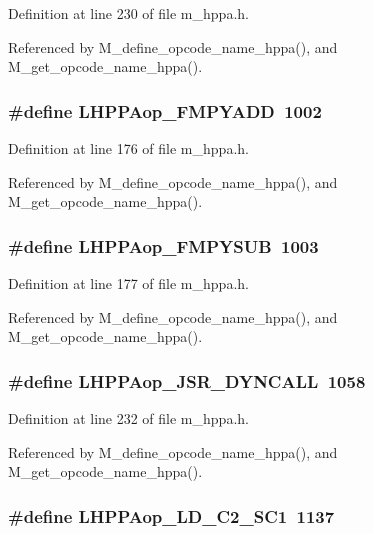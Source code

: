 Definition at line 230 of file m\_\-hppa.h.

Referenced by M\_\-define\_\-opcode\_\-name\_\-hppa(), and M\_\-get\_\-opcode\_\-name\_\-hppa().
\subsubsection{\setlength{\rightskip}{0pt plus 5cm}\#define LHPPAop\_\-FMPYADD~1002}\label{m__hppa_8h_5016d425f62ad5c6b7603207500e77b1}




Definition at line 176 of file m\_\-hppa.h.

Referenced by M\_\-define\_\-opcode\_\-name\_\-hppa(), and M\_\-get\_\-opcode\_\-name\_\-hppa().
\subsubsection{\setlength{\rightskip}{0pt plus 5cm}\#define LHPPAop\_\-FMPYSUB~1003}\label{m__hppa_8h_4dd7088cb1c1017e8788e7e512320c9d}




Definition at line 177 of file m\_\-hppa.h.

Referenced by M\_\-define\_\-opcode\_\-name\_\-hppa(), and M\_\-get\_\-opcode\_\-name\_\-hppa().
\subsubsection{\setlength{\rightskip}{0pt plus 5cm}\#define LHPPAop\_\-JSR\_\-DYNCALL~1058}\label{m__hppa_8h_80dcadb1e5464e6d3a4f33bedea8dd30}




Definition at line 232 of file m\_\-hppa.h.

Referenced by M\_\-define\_\-opcode\_\-name\_\-hppa(), and M\_\-get\_\-opcode\_\-name\_\-hppa().
\subsubsection{\setlength{\rightskip}{0pt plus 5cm}\#define LHPPAop\_\-LD\_\-C2\_\-SC1~1137}\label{m__hppa_8h_96f3494eb01d7d1303edb636bbe5b539}




